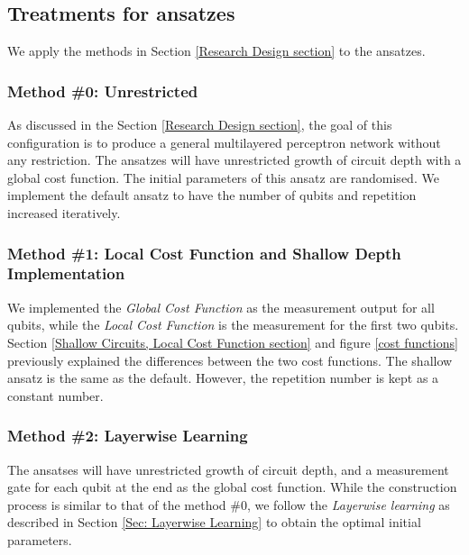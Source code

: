 \subsection{Treatments for ansatzes}
We apply the methods in Section \ref{Research Design section} to the ansatzes.

\subsubsection{Method \#0: Unrestricted}
As discussed in the Section \ref{Research Design section}, the goal of this configuration is to produce a general multilayered perceptron network without any restriction.
The ansatzes will have unrestricted growth of circuit depth with a global cost function.
The initial parameters of this ansatz are randomised.
We implement the default ansatz to have the number of qubits and repetition increased iteratively.

\subsubsection{Method \#1: Local Cost Function and Shallow Depth Implementation}
We implemented the \textit{Global Cost Function} as the measurement output for all qubits, while the \textit{Local Cost Function} is the measurement for the first two qubits.
Section \ref{Shallow Circuits, Local Cost Function section} and figure \ref{cost functions} previously explained the differences between the two cost functions.
The shallow ansatz is the same as the default.
However, the repetition number is kept as a constant number.

\subsubsection{Method \#2: Layerwise Learning}
The ansatses will have unrestricted growth of circuit depth, and a measurement gate for each qubit at the end as the global cost function.
While the construction process is similar to that of the method \#0, we follow the \emph{Layerwise learning} as described in Section \ref{Sec: Layerwise Learning} to obtain the optimal initial parameters.

